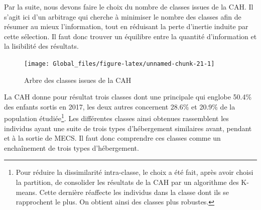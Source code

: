\documentclass[
  12,
  a4paper,
]{report}
\begin{document}
Par la suite, nous devons faire le choix du nombre de classes issues de
la CAH. Il s'agit ici d'un arbitrage qui cherche à minimiser le nombre
des classes afin de résumer au mieux l'information, tout en réduisant la
perte d'inertie induite par cette sélection. Il faut donc trouver un
équilibre entre la quantité d'information et la lisibilité des
résultats.

\begin{figure}

{\centering \texttt{[image: Global\_files/figure-latex/unnamed-chunk-21-1]} 

}

\caption{Arbre des classes issues de la CAH}\label{fig:unnamed-chunk-21}
\end{figure}


La CAH donne pour résultat trois classes dont une principale qui englobe
50.4\% des enfants sortis en 2017, les deux autres concernent 28.6\% et
20.9\% de la population étudiée\footnote{Pour réduire la dissimilarité
  intra-classe, le choix a été fait, après avoir choisi la partition, de
  consolider les résultats de la CAH par un algorithme des K-means.
  Cette dernière réaffecte les individus dans la classe dont ils se
  rapprochent le plus. On obtient ainsi des classes plus robustes.}. Les
différentes classes ainsi obtenues rassemblent les individus ayant une
suite de trois types d'hébergement similaires avant, pendant et à la
sortie de MECS. Il faut donc comprendre ces classes comme un
enchaînement de trois types d'hébergement.
\end{document}
